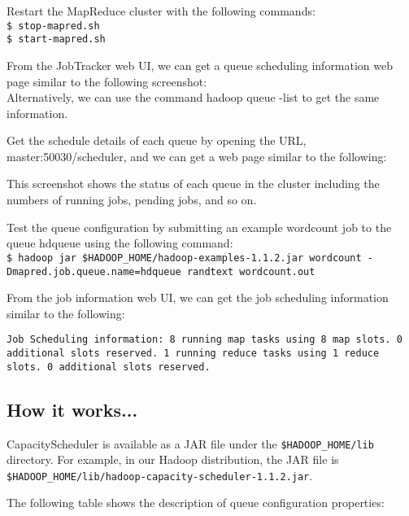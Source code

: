 Restart the MapReduce cluster with the following commands: \\
\verb|$ stop-mapred.sh| \\
\verb|$ start-mapred.sh| 

From the JobTracker web UI, we can get a queue scheduling information web page similar to the following screenshot: \\


Alternatively, we can use the command hadoop queue -list to get the same information. 

Get the schedule details of each queue by opening the URL, master:50030/scheduler, and we can get a web page similar to the following: 


This screenshot shows the status of each queue in the cluster including the numbers of running jobs, pending jobs, and so on. 

Test the queue configuration by submitting an example wordcount job to the queue hdqueue using the following command: \\ 
\verb|$ hadoop jar $HADOOP_HOME/hadoop-examples-1.1.2.jar wordcount -Dmapred.job.queue.name=hdqueue randtext wordcount.out | 

From the job information web UI, we can get the job scheduling information similar to the following: 
\begin{verbatim}
Job Scheduling information: 8 running map tasks using 8 map slots. 0 additional slots reserved. 1 running reduce tasks using 1 reduce slots. 0 additional slots reserved.
\end{verbatim}

\subsection*{How it works...}
CapacityScheduler is available as a JAR file under the \verb|$HADOOP_HOME/lib| directory. For example, in our Hadoop distribution, the JAR file is \verb|$HADOOP_HOME/lib/hadoop-capacity-scheduler-1.1.2.jar|.

The following table shows the description of queue configuration properties: 

